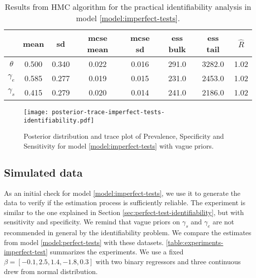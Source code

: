 \begin{table}[]
  \centering
  \caption{\label{tab:results-identifiability-imperfect-tests}Results from HMC
  algorithm for the practical identifiability analysis in model \eqref{model:imperfect-tests}.}
  \begin{tabular}{cccccccc}
    \hline
    \textbf{} & \textbf{mean} & \textbf{sd} & \textbf{mcse mean} &
    \textbf{mcse sd} & \textbf{ess bulk} & \textbf{ess tail} &
    \textbf{$\hat{R}$} \\ \hline
    $\theta$ & 0.500 & 0.340 & 0.022 & 0.016 & 291.0 & 3282.0 & 1.02 \\
    $\gamma_e$ & 0.585 & 0.277 & 0.019 & 0.015 & 231.0 & 2453.0 & 1.02 \\
    $\gamma_s$ & 0.415 & 0.279 & 0.020 & 0.014 & 241.0 & 2186.0 & 1.02 \\ \hline
  \end{tabular}
\end{table}

\begin{figure}[ht]
  \centering
  \caption{\label{fig:posterior-trace-imperfect-tests-identifiability}Posterior
  distribution and trace plot of Prevalence, Specificity and Sensitivity for
  model \eqref{model:imperfect-tests} with vague priors.}
  \texttt{[image: posterior-trace-imperfect-tests-identifiability.pdf]}
\end{figure}

\subsection{Simulated data}

As an initial check for model \eqref{model:imperfect-tests}, 
we use it to generate the data to verify if the estimation process
is sufficiently reliable. The experiment is similar to the one explained in
Section \ref{sec:perfect-test-identifiability}, but with sensitivity and 
specificity. We remind that vague priors on $\gamma_s$ and $\gamma_e$
are not recommended in general by the identifiability problem. We compare 
the estimates from model \eqref{model:perfect-tests} with these datasets.
\autoref{table:experiments-imperfect-test} summarizes the experiments. We use
a fixed $\beta = [-0.1, 2.5, 1.4, -1.8, 0.3]$ with two binary regressors and
three continuous drew from normal distribution. 


